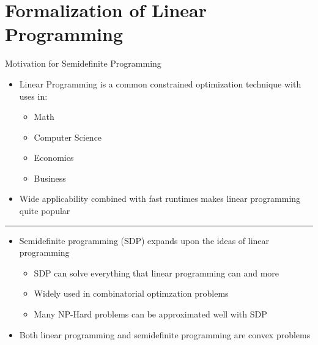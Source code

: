 \documentclass[
	11pt, %
]{beamer}
\begin{document}
\section{Formalization of Linear Programming}
\begin{frame}[label={sec:org0f20b1e}]{Motivation for Semidefinite Programming}
\begin{itemize}
\item Linear Programming is a common constrained optimization technique with uses in:
\begin{itemize}
\item Math
\item Computer Science
\item Economics
\item Business
\end{itemize}
\item Wide applicability combined with fast runtimes makes linear programming quite popular
\end{itemize}
\pause
\noindent\rule{\textwidth}{0.5pt}
\begin{itemize}
\item Semidefinite programming (SDP) expands upon the ideas of linear programming
\begin{itemize}
\item SDP can solve everything that linear programming can and more
\item Widely used in combinatorial optimzation problems
\item Many NP-Hard problems can be approximated well with SDP
\end{itemize}
\item Both linear programming and semidefinite programming are convex problems
\end{itemize}
\end{frame}
\end{document}
